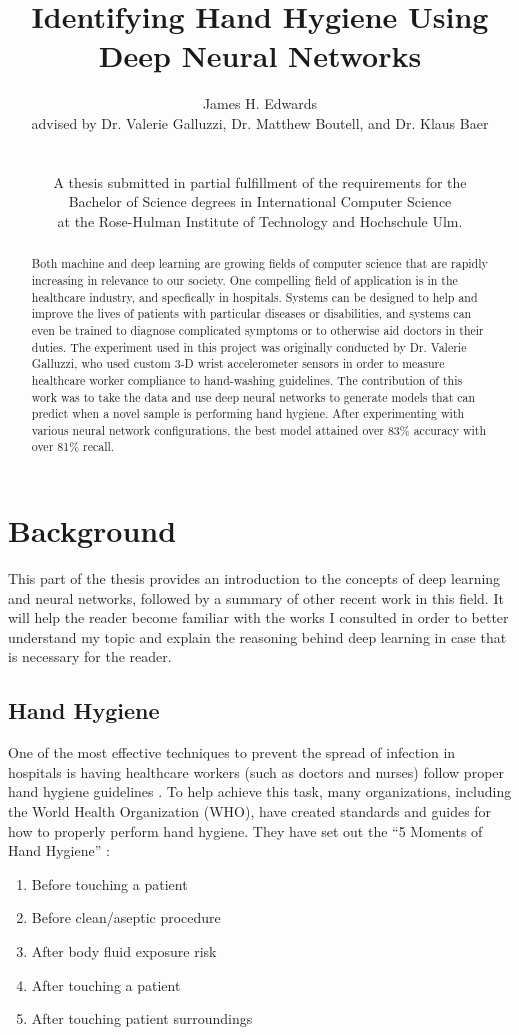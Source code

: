 \documentclass[]{report}
\title{Identifying Hand Hygiene Using Deep Neural Networks}
\author{James H. Edwards \\ 
	advised by Dr. Valerie Galluzzi, Dr. Matthew Boutell, and Dr. Klaus Baer\\
	\\
	\\
	A thesis submitted in partial fulfillment of the requirements for the \\
	Bachelor of Science degrees in International Computer Science \\
	at the Rose-Hulman Institute of Technology and Hochschule Ulm.}
\begin{document}
\maketitle
\tableofcontents

\begin{abstract}
	Both machine and deep learning are growing fields of computer science that are rapidly increasing in relevance to our society. One compelling field of application is in the healthcare industry, and specfically in hospitals. Systems can be designed to help and improve the lives of patients with particular diseases or disabilities, and systems can even be trained to diagnose complicated symptoms or to otherwise aid doctors in their duties. The experiment used in this project was originally conducted by Dr. Valerie Galluzzi, who used custom 3-D wrist accelerometer sensors in order to measure healthcare worker compliance to hand-washing guidelines. The contribution of this work was to take the data and use deep neural networks to generate models that can predict when a novel sample is performing hand hygiene. After experimenting with various neural network configurations, the best model attained over 83\% accuracy with over 81\% recall.
\end{abstract}

\chapter{Background}

This part of the thesis provides an introduction to the concepts of deep learning and neural networks, followed by a summary of other recent work in this field. It will help the reader become familiar with the works I consulted in order to better understand my topic and explain the reasoning behind deep learning in case that is necessary for the reader.


\section{Hand Hygiene}

One of the most effective techniques to prevent the spread of infection in hospitals is having healthcare workers (such as doctors and nurses) follow proper hand hygiene guidelines \cite{Galluzzi}. To help achieve this task, many organizations, including the World Health Organization (WHO), have created standards and guides for how to properly perform hand hygiene. They have set out the ``5 Moments of Hand Hygiene'' \cite{WHO}:
\begin{enumerate}
	\item Before touching a patient
	\item Before clean/aseptic procedure
	\item After body fluid exposure risk
	\item After touching a patient
	\item After touching patient surroundings
\end{enumerate}
\end{document}
